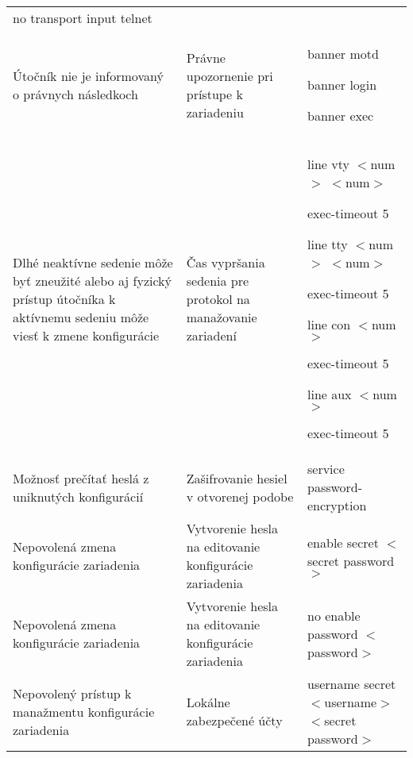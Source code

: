 \begin{longtable}[!htbp]{|L{10em}L{10em}>{\selectfont}L{34em}|}
	\hspace{0.5em}no transport input telnet\\
	
	
	
	
	 Útočník nie je informovaný o právnych následkoch	&Právne upozornenie pri prístupe k zariadeniu	&banner motd
	
	banner login
	
	banner exec\\
	
	
	
	Dlhé neaktívne sedenie môže byť zneužité alebo aj fyzický prístup útočníka k aktívnemu sedeniu môže viesť k zmene konfigurácie	&Čas vypršania sedenia pre protokol na manažovanie zariadení	&line vty $<$num$>$ $<$num$>$
	
	exec-timeout 5
	\vspace{0.5em}
	
	line tty $<$num$>$ $<$num$>$
	
	\hspace{0.5em}exec-timeout 5
	\vspace{0.5em}
	
	line con $<$num$>$
	
	\hspace{0.5em}exec-timeout 5
	\vspace{0.5em}
	
	line aux $<$num$>$
	
	\hspace{0.5em}exec-timeout 5\\
	
	
	
	
	 Možnosť prečítať heslá z uniknutých konfigurácií	&Zašifrovanie hesiel v otvorenej podobe	&service password-encryption\\
	
	
	
	
	Nepovolená zmena konfigurácie zariadenia	&Vytvorenie hesla na editovanie konfigurácie zariadenia	&enable secret $<$secret password$>$\\
	
	
	
	
	 Nepovolená zmena konfigurácie zariadenia	&Vytvorenie hesla na editovanie konfigurácie zariadenia	&no enable password $<$password$>$\\
	
	
	
	Nepovolený prístup k manažmentu konfigurácie zariadenia	&Lokálne zabezpečené účty	&username secret $<$username$>$ $<$secret password$>$\\
	

\end{longtable}
